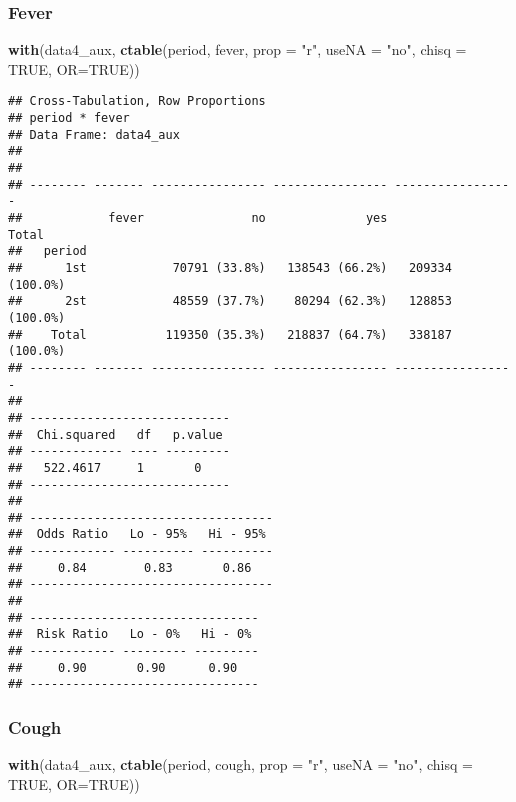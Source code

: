 \documentclass[
]{article}
\newenvironment{Shaded}{\begin{snugshade}}{\end{snugshade}}
\newcommand{\DataTypeTok}[1]{\textcolor[rgb]{0.13,0.29,0.53}{#1}}
\newcommand{\KeywordTok}[1]{\textcolor[rgb]{0.13,0.29,0.53}{\textbf{#1}}}
\newcommand{\NormalTok}[1]{#1}
\newcommand{\OtherTok}[1]{\textcolor[rgb]{0.56,0.35,0.01}{#1}}
\newcommand{\StringTok}[1]{\textcolor[rgb]{0.31,0.60,0.02}{#1}}
\begin{document}
\hypertarget{fever}{%
\subsubsection{Fever}\label{fever}}

\begin{Shaded}
\begin{Highlighting}[]
\KeywordTok{with}\NormalTok{(data4_aux, }\KeywordTok{ctable}\NormalTok{(period, fever, }\DataTypeTok{prop =} \StringTok{"r"}\NormalTok{, }\DataTypeTok{useNA =} \StringTok{"no"}\NormalTok{, }\DataTypeTok{chisq =} \OtherTok{TRUE}\NormalTok{, }\DataTypeTok{OR=}\OtherTok{TRUE}\NormalTok{))}
\end{Highlighting}
\end{Shaded}

\begin{verbatim}
## Cross-Tabulation, Row Proportions  
## period * fever  
## Data Frame: data4_aux  
## 
## 
## -------- ------- ---------------- ---------------- -----------------
##            fever               no              yes             Total
##   period                                                            
##      1st            70791 (33.8%)   138543 (66.2%)   209334 (100.0%)
##      2st            48559 (37.7%)    80294 (62.3%)   128853 (100.0%)
##    Total           119350 (35.3%)   218837 (64.7%)   338187 (100.0%)
## -------- ------- ---------------- ---------------- -----------------
## 
## ----------------------------
##  Chi.squared   df   p.value 
## ------------- ---- ---------
##   522.4617     1       0    
## ----------------------------
## 
## ----------------------------------
##  Odds Ratio   Lo - 95%   Hi - 95% 
## ------------ ---------- ----------
##     0.84        0.83       0.86   
## ----------------------------------
## 
## --------------------------------
##  Risk Ratio   Lo - 0%   Hi - 0% 
## ------------ --------- ---------
##     0.90       0.90      0.90   
## --------------------------------
\end{verbatim}

\hypertarget{cough}{%
\subsubsection{Cough}\label{cough}}

\begin{Shaded}
\begin{Highlighting}[]
\KeywordTok{with}\NormalTok{(data4_aux, }\KeywordTok{ctable}\NormalTok{(period, cough, }\DataTypeTok{prop =} \StringTok{"r"}\NormalTok{, }\DataTypeTok{useNA =} \StringTok{"no"}\NormalTok{, }\DataTypeTok{chisq =} \OtherTok{TRUE}\NormalTok{, }\DataTypeTok{OR=}\OtherTok{TRUE}\NormalTok{))}
\end{Highlighting}
\end{Shaded}
\end{document}
